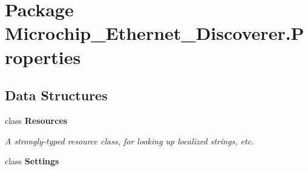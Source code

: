 \hypertarget{namespace_microchip___ethernet___discoverer_1_1_properties}{}\section{Package Microchip\+\_\+\+Ethernet\+\_\+\+Discoverer.\+Properties}
\label{namespace_microchip___ethernet___discoverer_1_1_properties}
\subsection*{Data Structures}
\begin{DoxyCompactItemize}
\item 
class {\bfseries Resources}
\begin{DoxyCompactList}\small\item\em A strongly-\/typed resource class, for looking up localized strings, etc. \end{DoxyCompactList}\item 
class {\bfseries Settings}
\end{DoxyCompactItemize}
